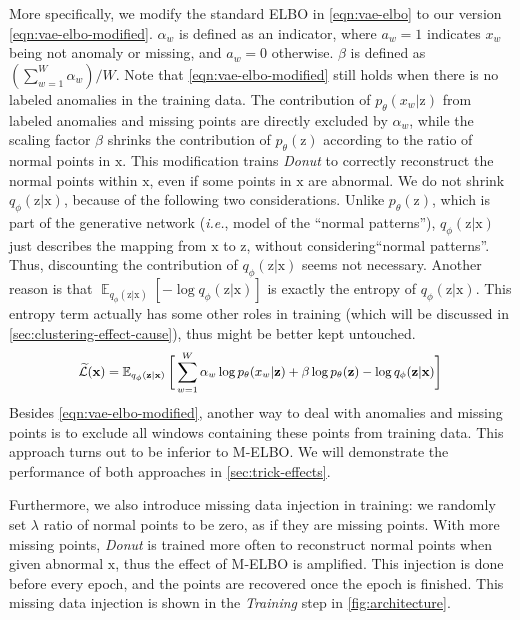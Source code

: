\documentclass[sigconf]{acmart}
\newcommand{\DONUT}{\textit{Donut}}
\newcommand{\IE}{\textit{i.e.}}
\newcommand{\vv}[1]{\bm{\mathrm{{#1}}}}
\newcommand{\E}{\operatorname{\mathbb{E}}}
\begin{document}
More specifically, we modify the standard ELBO in \cref{eqn:vae-elbo} to our version \cref{eqn:vae-elbo-modified}.
$\alpha_w$ is defined as an indicator, where $a_w = 1$ indicates $x_w$ being not anomaly or missing, and $a_w = 0$ otherwise.
$\beta$ is defined as $(\sum_{w=1}^W \alpha_w) / W$. Note that  \cref{eqn:vae-elbo-modified} still holds when there is no labeled anomalies in the training data.
The contribution of $p_{\theta}(x_w|\vv{z})$ from labeled anomalies and missing points are directly excluded by $\alpha_w$, while the scaling factor $\beta$ shrinks the contribution of $p_{\theta}(\vv{z})$ according to the ratio of normal points in $\vv{x}$.
This modification trains \DONUT{} to correctly reconstruct the normal points within $\vv{x}$, even if some points in $\vv{x}$ are abnormal.
We do not shrink $q_{\phi}(\vv{z}|\vv{x})$, because of the following two considerations.
Unlike $p_{\theta}(\vv{z})$, which is part of the generative network (\IE, model of the ``normal patterns''), $q_{\phi}(\vv{z}|\vv{x})$ just describes the mapping from $\vv{x}$ to $\vv{z}$, without considering``normal patterns''.
Thus, discounting the contribution of $q_{\phi}(\vv{z}|\vv{x})$ seems not necessary.
Another reason is that $\E_{q_{\phi}(\vv{z}|\vv{x})}[-\log q_{\phi}(\vv{z}|\vv{x})]$ is exactly the entropy of $q_{\phi}(\vv{z}|\vv{x})$.
This entropy term actually has some other roles in training (which will be discussed in \cref{sec:clustering-effect-cause}), thus might be better kept untouched.
\begin{equation}
\small{
	\widetilde{\mathcal{L}}(\vv{x})
		= \E_{q_{\phi}(\vv{z}|\vv{x})}\bigg[\sum_{w=1}^W \alpha_w \log p_{\theta}(x_w|\vv{z}) + \beta \log p_{\theta}(\vv{z}) - \log q_{\phi}(\vv{z}|\vv{x})\bigg]
	\label{eqn:vae-elbo-modified}
}
\end{equation}
Besides \cref{eqn:vae-elbo-modified}, another way to deal with anomalies and missing points is to exclude all windows containing these points from training data.
This approach turns out to be inferior to M-ELBO.
We will demonstrate the performance of both approaches in \cref{sec:trick-effects}.

Furthermore, we also introduce missing data injection in training: we randomly set $\lambda$ ratio of normal points to be zero, as if they are missing points.
With more missing points, \DONUT{} is trained more often to reconstruct normal points when given abnormal $\vv{x}$, thus the effect of M-ELBO is amplified.
This injection is done before every epoch, and the points are recovered once the epoch is finished. This missing data injection is shown in  the \textit{Training} step in \cref{fig:architecture}.
\end{document}
